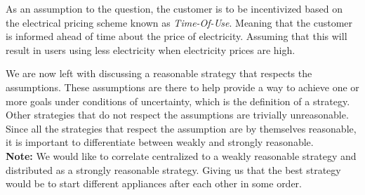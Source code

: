 \documentclass{article}
\begin{document}
	
	As an assumption to the question, the customer is to be incentivized based on the electrical pricing scheme known as \emph{Time-Of-Use}. Meaning that the customer is informed ahead of time about the price of electricity. Assuming that this will result in users using less electricity when electricity prices are high.
	
	We are now left with discussing a reasonable strategy that respects the assumptions. These assumptions are there to help provide a way to achieve one or more goals under conditions of uncertainty, which is the definition of a strategy. Other strategies that do not respect the assumptions are trivially unreasonable. Since all the strategies that respect the assumption are by themselves reasonable, it is important to differentiate between weakly and strongly reasonable.\\
	
	\noindent \textbf{Note:} We would like to correlate centralized to a weakly reasonable strategy and distributed as a strongly reasonable strategy. Giving us that the best strategy would be to start different appliances after each other in some order.


    
    
    \printbibliography[heading=bibintoc]
\end{document}
